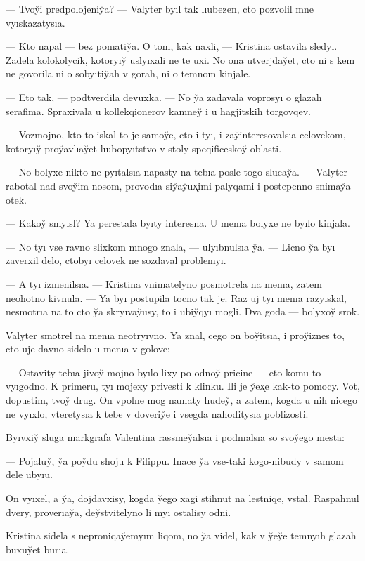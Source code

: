 \documentclass[10pt]{book}
\begin{document}
— Tvoy̆i predpolojeniy̆a? — Valyter byıl tak lıubezen, cto pozvolil mne vyıskazatysıa.

— Kto napal — bez ponıatiy̆a. O tom, kak naxli, — Kristina ostavila sledyı. Zadela kolokolycik, kotoryıy̆ uslyıxali ne te uxi. No ona utverjday̆et, cto ni s kem ne govorila ni o sobyıtiy̆ah v gorah, ni o temnom kinjale.

— Eto tak, — podtverdila devuxka. — No y̆a zadavala voprosyı o glazah serafima. Spraxivala u kollekqionerov kamney̆ i u hagjitskih torgovqev.

— Vozmojno, kto-to iskal to je samoy̆e, cto i tyı, i zay̆interesovalsıa celovekom, kotoryıy̆ proy̆avlıay̆et lıubopyıtstvo v stoly speqificeskoy̆ oblasti.

— No bolyxe nikto ne pyıtalsıa napasty na tebıa posle togo slucay̆a. — Valyter rabotal nad svoy̆im nosom, provodıa siy̆ay̆ux̨imi palyqami i postepenno snimay̆a otek.

— Kakoy̆ smyısl? Ya perestala byıty interesna. U menıa bolyxe ne byılo kinjala.

— No tyı vse ravno slixkom mnogo znala, — ulyıbnulsıa y̆a. — Licno y̆a byı zaverxil delo, ctobyı celovek ne sozdaval problemyı.

— A tyı izmenilsıa. — Kristina vnimatelyno posmotrela na menıa, zatem neohotno kivnula. — Ya byı postupila tocno tak je. Raz uj tyı menıa razyıskal, nesmotrıa na to cto y̆a skryıvay̆usy, to i ubiy̆qyı mogli. Dva goda — bolyxoy̆ srok.

Valyter smotrel na menıa neotryıvno. Ya znal, cego on boy̆itsıa, i proy̆iznes to, cto uje davno sidelo u menıa v golove:

— Ostavity tebıa jivoy̆ mojno byılo lixy po odnoy̆ pricine — eto komu-to vyıgodno. K primeru, tyı mojexy privesti k klinku. Ili je y̆ex̨e kak-to pomocy. Vot, dopustim, tvoy̆ drug. On vpolne mog nanıaty lıudey̆, a zatem, kogda u nih nicego ne vyıxlo, vteretysıa k tebe v doveriy̆e i vsegda nahoditysıa poblizosti.

Byıvxiy̆ sluga markgrafa Valentina rassmey̆alsıa i podnıalsıa so svoy̆ego mesta:

— Pojaluy̆, y̆a poy̆du shoju k Filippu. Inace y̆a vse-taki kogo-nibudy v samom dele ubyıu.

On vyıxel, a y̆a, dojdavxisy, kogda y̆ego xagi stihnut na lestniqe, vstal. Raspahnul dvery, proverıay̆a, dey̆stvitelyno li myı ostalisy odni.

Kristina sidela s neproniqay̆emyım liqom, no y̆a videl, kak v y̆ey̆e temnyıh glazah buxuy̆et burıa.
\end{document}
